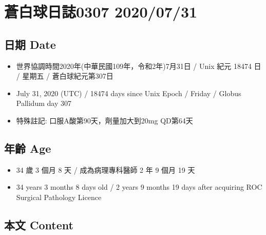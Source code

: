 \documentclass[a5paper, 11pt
]{book}
\providecommand{\tightlist}{%
  \setlength{\itemsep}{0pt}\setlength{\parskip}{0pt}}
\begin{document}
\hypertarget{ux84bcux767dux7403ux65e5ux8a8c0307-20200731}{%
\section{蒼白球日誌0307
2020/07/31}\label{ux84bcux767dux7403ux65e5ux8a8c0307-20200731}}

\hypertarget{ux65e5ux671f-date-52}{%
\subsection{日期 Date}\label{ux65e5ux671f-date-52}}

\begin{itemize}
\tightlist
\item
  世界協調時間2020年(中華民國109年，令和2年)7月31日 / Unix 紀元 18474 日
  / 星期五 / 蒼白球紀元第307日
\item
  July 31, 2020 (UTC) / 18474 days since Unix Epoch / Friday / Globus
  Pallidum day 307
\item
  特殊註記: 口服A酸第90天，劑量加大到20mg QD第64天
\end{itemize}

\hypertarget{ux5e74ux9f61-age-52}{%
\subsection{年齡 Age}\label{ux5e74ux9f61-age-52}}

\begin{itemize}
\tightlist
\item
  34 歲 3 個月 8 天 / 成為病理專科醫師 2 年 9 個月 19 天
\item
  34 years 3 months 8 days old / 2 years 9 months 19 days after
  acquiring ROC Surgical Pathology Licence
\end{itemize}

\hypertarget{ux672cux6587-content-52}{%
\subsection{本文 Content}\label{ux672cux6587-content-52}}
\end{document}
